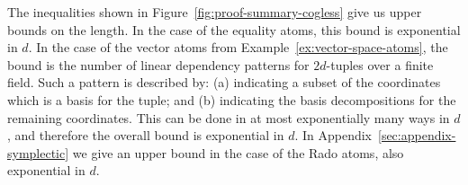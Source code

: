 
The inequalities shown in Figure~\ref{fig:proof-summary-cogless} give us upper bounds on the length. In the case of the equality atoms, this bound is exponential in $d$. In the case of the vector atoms from Example~\ref{ex:vector-space-atoms}, the bound is the number of  linear dependency patterns for $2d$-tuples over a finite field. Such a pattern is described by: (a) indicating a subset of the coordinates which is a basis for the tuple; and (b) indicating the basis decompositions for the remaining coordinates. This can be done in at most exponentially many ways in $d$, and therefore the overall bound is  exponential in $d$.
In Appendix~\ref{sec:appendix-symplectic} we give an upper bound in the case of the Rado atoms, also exponential in $d$.
